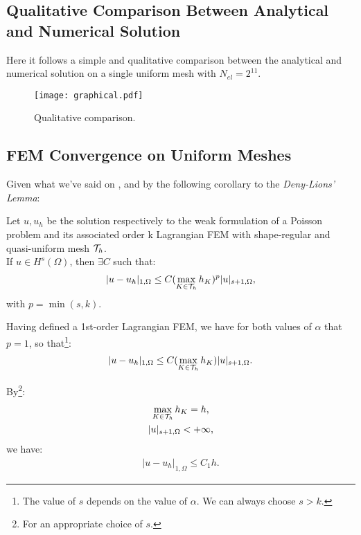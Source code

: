 \subsection{Qualitative Comparison Between Analytical and Numerical Solution}

Here it follows a simple and qualitative comparison between the analytical and numerical solution on a single uniform mesh with $N_{el} = 2^{11}$.

\begin{figure}[!ht]
	\centering
	\texttt{[image: graphical.pdf]}
	\caption{Qualitative comparison.}
\end{figure}

\subsection{FEM Convergence on Uniform Meshes}

Given what we've said on , and by the following corollary to the \textit{Deny-Lions' Lemma}:

\begin{theorem}
	Let $u, u_h$ be the solution respectively to the weak formulation of a Poisson problem and its associated order k Lagrangian FEM with shape-regular and quasi-uniform mesh $\mathcal{T}_h$. \\ 
	If $u \in H^s(\Omega)$, then $\exists C$ such that:
	\begin{gather}
		|u - u_h|_{1, \Omega} \le C (\max_{K \in \mathcal{T}_h} h_K)^{p}|u|_{s+1, \Omega},
	\end{gather}
	with $p = \min(s, k)$.
\end{theorem}

Having defined a 1st-order Lagrangian FEM, we have for both values of $\alpha$ that $p = 1$, so that\footnote{The value of $s$ depends on the value of $\alpha$. We can always choose $s > k$.}:
\begin{gather}
	|u - u_h|_{1, \Omega} \le C (\max_{K \in \mathcal{T}_h} h_K)|u|_{s+1, \Omega}.
\end{gather}

By\footnote{For an appropriate choice of $s$.}:
\begin{gather}
	\max_{K \in \mathcal{T}_h} h_K = h, \\
	|u|_{s+1, \Omega} < +\infty,
\end{gather}
we have:
\begin{gather}
	|u - u_h|_{1, \Omega} \le C_1 h.
\end{gather}

